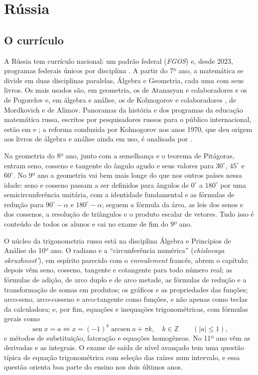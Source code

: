 \documentclass[
    article,
    12pt,
    a4paper,
    sumario=tradicional
]{abntex2}
\DeclareMathOperator{\arcsen}{arcsen}
\begin{document}
\section{Rússia}

\subsection{O currículo}

A Rússia tem currículo nacional: um padrão federal (\textit{FGOS}) e, desde
2023, programas federais únicos por disciplina \cite{fgos}. A partir do 7º
ano, a matemática se divide em duas disciplinas paralelas, Álgebra e
Geometria, cada uma com seus livros. Os mais usados são, em geometria, os de
Atanasyan e colaboradores \cite{atanasyan} e os de Pogorelov e, em álgebra e
análise, os de Kolmogorov e colaboradores \cite{kolmogorov}, de Mordkovich e de
Alimov. Panoramas da história e dos programas da educação matemática russa,
escritos por pesquisadores russos para o público internacional, estão em
 e ; a reforma conduzida por
Kolmogorov nos anos 1970, que deu origem aos livros de álgebra e análise ainda
em uso, é analisada por .

Na geometria do 8º ano, junto com a semelhança e o teorema de Pitágoras, entram
seno, cosseno e tangente do ângulo agudo e seus valores para $30^\circ$,
$45^\circ$ e $60^\circ$. No 9º ano a geometria vai bem mais longe do que nos
outros países nessa idade: seno e cosseno passam a ser definidos para ângulos
de $0^\circ$ a $180^\circ$ por uma semicircunferência unitária, com a identidade
fundamental e as fórmulas de redução para $90^\circ-\alpha$ e $180^\circ-\alpha$;
seguem a fórmula da área, as leis dos senos e dos cossenos, a resolução de
triângulos e o produto escalar de vetores. Tudo isso é conteúdo de todos os
alunos e cai no exame de fim do 9º ano.

O núcleo da trigonometria russa está na disciplina Álgebra e Princípios de
Análise do 10º ano. O radiano e a ``circunferência numérica''
(\textit{chislovaya okruzhnost'}), em espírito parecido com o
\textit{enroulement} francês, abrem o capítulo; depois vêm seno, cosseno,
tangente e cotangente para todo número real; as fórmulas de adição, de arco
duplo e de arco metade, as fórmulas de redução e a transformação de somas em
produtos; os gráficos e as propriedades das funções; arco-seno, arco-cosseno e
arco-tangente como funções, e não apenas como teclas da calculadora; e, por
fim, equações e inequações trigonométricas, com fórmulas gerais como
\[
\operatorname{sen}x = a \iff x = (-1)^k\arcsen a + \pi k,\quad k\in\mathbb{Z}\qquad (|a|\le 1),
\]
e métodos de substituição, fatoração e equações homogêneas. No 11º ano vêm as
derivadas e as integrais. O exame de saída de nível avançado tem uma questão
típica de equação trigonométrica com seleção das raízes num intervalo, e essa
questão orienta boa parte do ensino nos dois últimos anos.
\end{document}
